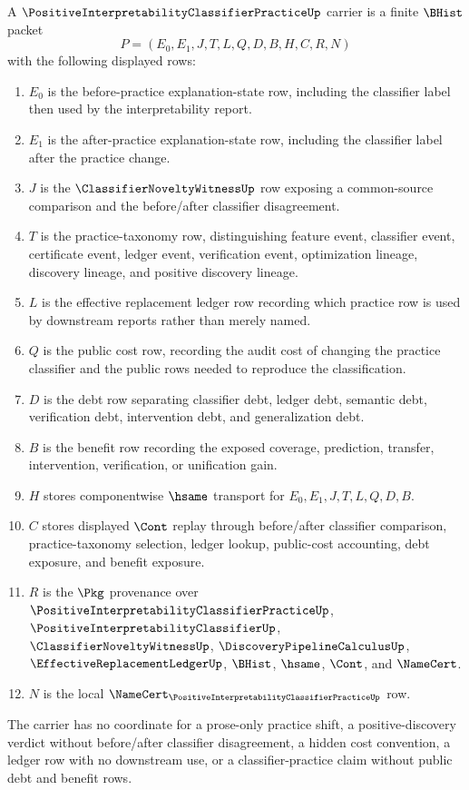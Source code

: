 \begin{definition}
\label{def:positive-interpretability-classifier-practice-carrier}
A $\PositiveInterpretabilityClassifierPracticeUp$ carrier is a finite $\BHist$ packet
$$
P=(E_0,E_1,J,T,L,Q,D,B,H,C,R,N)
$$
with the following displayed rows:
\begin{enumerate}
\item $E_0$ is the before-practice explanation-state row, including the classifier label then used by the interpretability report.
\item $E_1$ is the after-practice explanation-state row, including the classifier label after the practice change.
\item $J$ is the $\ClassifierNoveltyWitnessUp$ row exposing a common-source comparison and the before/after classifier disagreement.
\item $T$ is the practice-taxonomy row, distinguishing feature event, classifier event, certificate event, ledger event, verification event, optimization lineage, discovery lineage, and positive discovery lineage.
\item $L$ is the effective replacement ledger row recording which practice row is used by downstream reports rather than merely named.
\item $Q$ is the public cost row, recording the audit cost of changing the practice classifier and the public rows needed to reproduce the classification.
\item $D$ is the debt row separating classifier debt, ledger debt, semantic debt, verification debt, intervention debt, and generalization debt.
\item $B$ is the benefit row recording the exposed coverage, prediction, transfer, intervention, verification, or unification gain.
\item $H$ stores componentwise $\hsame$ transport for $E_0,E_1,J,T,L,Q,D,B$.
\item $C$ stores displayed $\Cont$ replay through before/after classifier comparison, practice-taxonomy selection, ledger lookup, public-cost accounting, debt exposure, and benefit exposure.
\item $R$ is the $\Pkg$ provenance over $\PositiveInterpretabilityClassifierPracticeUp$, $\PositiveInterpretabilityClassifierUp$, $\ClassifierNoveltyWitnessUp$, $\DiscoveryPipelineCalculusUp$, $\EffectiveReplacementLedgerUp$, $\BHist$, $\hsame$, $\Cont$, and $\NameCert$.
\item $N$ is the local $\NameCert_{\PositiveInterpretabilityClassifierPracticeUp}$ row.
\end{enumerate}
The carrier has no coordinate for a prose-only practice shift, a positive-discovery verdict without before/after classifier disagreement, a hidden cost convention, a ledger row with no downstream use, or a classifier-practice claim without public debt and benefit rows.
\end{definition}

